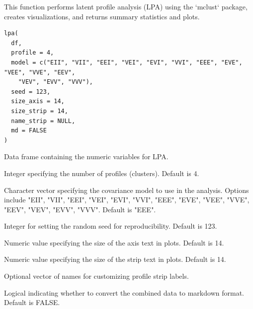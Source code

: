 \documentclass[a4paper]{book}
\begin{document}
%
\begin{Description}
This function performs latent profile analysis (LPA) using the `mclust` package, creates visualizations,
and returns summary statistics and plots.
\end{Description}
%
\begin{Usage}
\begin{verbatim}
lpa(
  df,
  profile = 4,
  model = c("EII", "VII", "EEI", "VEI", "EVI", "VVI", "EEE", "EVE", "VEE", "VVE", "EEV",
    "VEV", "EVV", "VVV"),
  seed = 123,
  size_axis = 14,
  size_strip = 14,
  name_strip = NULL,
  md = FALSE
)
\end{verbatim}
\end{Usage}
%
\begin{Arguments}
\begin{ldescription}
\item[\code{df}] Data frame containing the numeric variables for LPA.

\item[\code{profile}] Integer specifying the number of profiles (clusters). Default is 4.

\item[\code{model}] Character vector specifying the covariance model to use in the analysis.
Options include "EII", "VII", "EEI", "VEI", "EVI", "VVI", "EEE", "EVE", "VEE", "VVE",
"EEV", "VEV", "EVV", "VVV". Default is "EEE".

\item[\code{seed}] Integer for setting the random seed for reproducibility. Default is 123.

\item[\code{size\_axis}] Numeric value specifying the size of the axis text in plots. Default is 14.

\item[\code{size\_strip}] Numeric value specifying the size of the strip text in plots. Default is 14.

\item[\code{name\_strip}] Optional vector of names for customizing profile strip labels.

\item[\code{md}] Logical indicating whether to convert the combined data to markdown format. Default is FALSE.
\end{ldescription}
\end{Arguments}
%
\end{document}
